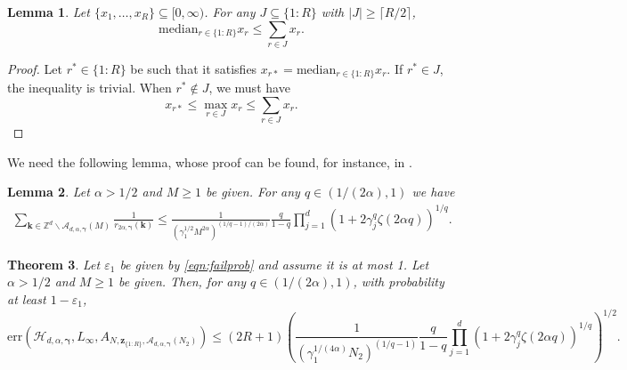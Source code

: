 \documentclass[a4paper,11pt]{article}
\newtheorem{theorem}{Theorem}[section]
\newtheorem{lemma}[theorem]{Lemma}
\newcommand{\bsh}{\boldsymbol{h}}
\newcommand{\bsk}{\boldsymbol{k}}
\newcommand{\bsz}{\boldsymbol{z}}
\newcommand{\bsgamma}{\boldsymbol{\gamma}}
\newcommand{\ZZ}{\mathbb{Z}}
\newcommand{\Acal}{\mathcal{A}}
\newcommand{\Hcal}{\mathcal{H}}
\begin{document}
\begin{lemma}\label{lem:medtosum}
    Let $\{x_1,\dots,x_R\}\subseteq [0,\infty)$. For any $J\subseteq \{1{:}R\}$ with $|J|\geq \lceil R/2 \rceil$,
    $$\mathrm{median}_{r\in\{1{:}R\}} x_r \leq \sum_{r\in J} x_r.$$
\end{lemma}
\begin{proof}
    Let $r^*\in \{1{:}R\}$ be such that it satisfies $x_{r*}=\mathrm{median}_{r\in\{1{:}R\}} x_r$. If $r^*\in J$, the inequality is trivial. When $r^*\notin J$, we must have
    $$x_{r*}\leq \max_{r\in J} x_r\leq \sum_{r\in J} x_r. $$
\end{proof}

We need the following lemma, whose proof can be found, for instance, in \cite[Chapter~14, Lemma~14.2]{DKP22}.
\begin{lemma}\label{lem_sum}
Let $\alpha>1/2$ and $M\geq 1$ be given. For any $q\in(1/(2\alpha),1)$ we have 
\begin{align*}
\sum_{\bsk\in\mathbb{Z}^d\backslash \Acal_{d, \alpha,\bsgamma}(M)}\frac{1}{r_{2\alpha,\bsgamma}(\bsk)}\leq \frac{1}{(\gamma_1^{1/2} M^{2\alpha})^{(1/q-1)/(2\alpha)}}\frac{q}{1-q}\prod_{j=1}^d\left(1+2\gamma_j^{q} \zeta(2\alpha q)  \right)^{1/q}.
\end{align*}
\end{lemma}

\begin{theorem}\label{thm:infty}
Let $\varepsilon_1$ be given by \eqref{eqn:failprob} and assume it 
is at most 1. Let $\alpha>1/2$ and $M\ge 1$ be given.
Then, for any $q\in(1/(2\alpha),1)$, with probability at least $1-\varepsilon_1$,
    $$\mathrm{err}(\Hcal_{d,\alpha,\bsgamma}, L_\infty, A_{N,\bsz_{\{1{:}R\}},\Acal_{d,\alpha,\bsgamma}(N_2)})\leq ( 2R+1) \left( \frac{1}{(\gamma_1^{1/(4\alpha)} N_2)^{(1/q-1)}}\frac{q}{1-q}\prod_{j=1}^d\left(1+2\gamma_j^{q} \zeta(2\alpha q)  \right)^{1/q} \right)^{1/2}. %
    $$
\end{theorem}
\end{document}
